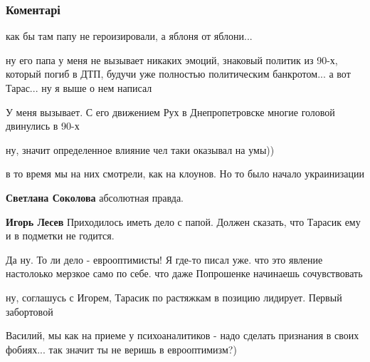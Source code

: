  
 
 
 
 
\subsubsection{Коментарі}
\label{sec:23_05_2018.fb.lesev_igor.1.taras_chernovol_klassik_predatelstva.cmt}

\begin{itemize} %
как бы там папу не героизировали, а яблоня от яблони...

\begin{itemize} %

ну его папа у меня не вызывает никаких эмоций, знаковый политик из 90-х,
который погиб в ДТП, будучи уже полностью политическим банкротом... а вот
Тарас... ну я выше о нем написал

У меня вызывает. С его движением Рух в Днепропетровске многие головой двинулись в 90-х

ну, значит определенное влияние чел таки оказывал на умы))

в то время мы на них смотрели, как на клоунов. Но то было начало украинизации

\textbf{Светлана Соколова} абсолютная правда.

\textbf{Игорь Лесев} Приходилось иметь дело с папой. Должен сказать, что Тарасик ему и в подметки не годится.
\end{itemize} %


Да ну. То ли дело - еврооптимисты! Я где-то писал уже. что это явление
настолоько мерзкое само по себе. что даже Попрошенке начинаешь сочувствовать

\begin{itemize} %
ну, соглашусь с Игорем, Тарасик по растяжкам в позицию лидирует. Первый забортовой

Василий, мы как на приеме у психоаналитиков - надо сделать признания в своих фобиях... так значит ты не веришь в еврооптимизм?)


\end{itemize}
\end{itemize}
